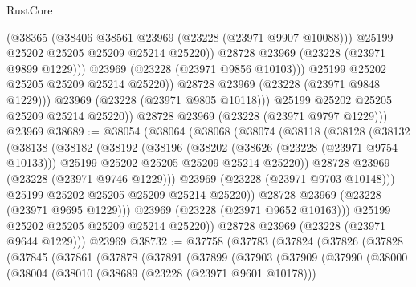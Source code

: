 \begin{lexlean}{RustCore}
\begin{coremodule}
                        (@38365
                          (@38406 @38561 @23969 (@23228 (@23971 @9907 @10088)))
                          @25199
                          @25202
                          @25205
                          @25209
                          @25214
                          @25220))
                      @28728
                      @23969
                      (@23228 (@23971 @9899 @1229)))
                    @23969
                    (@23228 (@23971 @9856 @10103)))
                  @25199
                  @25202
                  @25205
                  @25209
                  @25214
                  @25220))
              @28728
              @23969
              (@23228 (@23971 @9848 @1229)))
            @23969
            (@23228 (@23971 @9805 @10118)))
          @25199
          @25202
          @25205
          @25209
          @25214
          @25220))
      @28728
      @23969
      (@23228 (@23971 @9797 @1229)))
    @23969
@38689 := @38054
    (@38064
      (@38068
        (@38074
          (@38118
            (@38128
              (@38132
                (@38138
                  (@38182
                    (@38192
                      (@38196
                        (@38202
                          (@38626 (@23228 (@23971 @9754 @10133)))
                          @25199
                          @25202
                          @25205
                          @25209
                          @25214
                          @25220))
                      @28728
                      @23969
                      (@23228 (@23971 @9746 @1229)))
                    @23969
                    (@23228 (@23971 @9703 @10148)))
                  @25199
                  @25202
                  @25205
                  @25209
                  @25214
                  @25220))
              @28728
              @23969
              (@23228 (@23971 @9695 @1229)))
            @23969
            (@23228 (@23971 @9652 @10163)))
          @25199
          @25202
          @25205
          @25209
          @25214
          @25220))
      @28728
      @23969
      (@23228 (@23971 @9644 @1229)))
    @23969
@38732 := @37758
    (@37783
      (@37824
        (@37826
          (@37828
            (@37845
              (@37861
                (@37878
                  (@37891
                    (@37899
                      (@37903
                        (@37909
                          (@37990
                            (@38000
                              (@38004
                                (@38010
                                  (@38689 (@23228 (@23971 @9601 @10178)))

\end{coremodule}
\end{lexlean}
